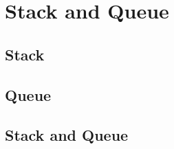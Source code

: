 \chapter{Stack and Queue}	\label{chapter:stack-queue}

\section{Stack}

\section{Queue}



\section{Stack and Queue}

